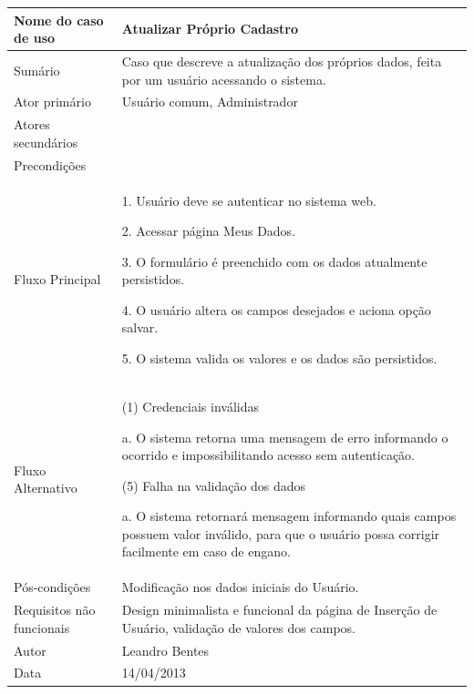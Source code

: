 \begin{flushleft}
\tablefirsthead{}
\tablehead{}
\tabletail{}
\tablelasttail{}
\begin{supertabular}{|m{5.5680003cm}|m{9.325cm}|}
\hline
Nome do caso de uso &
Atualizar Próprio Cadastro\\\hline
Sumário &
Caso que descreve a atualização dos próprios dados, feita por um usuário acessando o sistema.\\\hline
Ator primário &
Usuário comum, Administrador\\\hline
Atores secundários &
~
\\\hline
Precondições &
~
\\\hline
Fluxo Principal &
1. Usuário deve se autenticar no sistema web.

2. Acessar página Meus Dados.

3. O formulário é preenchido com os dados atualmente persistidos.

4. O usuário altera os campos desejados e aciona opção salvar.

5. O sistema valida os valores e os dados são persistidos.\\\hline
Fluxo Alternativo &
(1) Credenciais inválidas

a. O sistema retorna uma mensagem de erro informando o ocorrido e impossibilitando acesso sem autenticação.

(5) Falha na validação dos dados

a. O sistema retornará mensagem informando quais campos possuem valor inválido, para que o usuário possa corrigir facilmente em caso de engano.\\\hline
Pós-condições &
Modificação nos dados iniciais do Usuário.\\\hline
Requisitos não funcionais &
Design minimalista e funcional da página de Inserção de Usuário, validação de valores dos campos.\\\hline
Autor &
Leandro Bentes\\\hline
Data &
14/04/2013\\\hline
\end{supertabular}
\end{flushleft}

